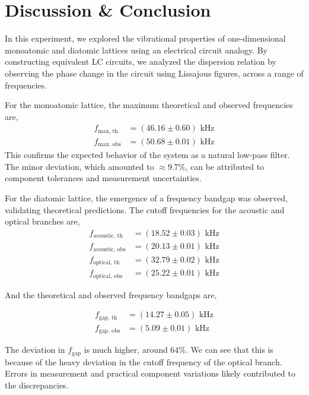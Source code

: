\vspace{-2em}
\section{Discussion \& Conclusion}

In this experiment, we explored the vibrational properties of
one-dimensional monoatomic and diatomic lattices using
an electrical circuit analogy. By constructing equivalent
LC circuits, we analyzed the dispersion relation by observing the phase change in the circuit using Lissajous figures, across a range of frequencies.

For the monoatomic lattice, the maximum theoretical and observed frequencies are,
\begin{align*}
    f_\text{max, th} &= (46.16 \pm 0.60) \text{ kHz}\\
    f_\text{max, obs} &= (50.68 \pm 0.01) \text{ kHz}
\end{align*}
This confirms the expected behavior of the system as a natural low-pass filter. The minor
deviation, which amounted to $\approx$9.7\%, can be attributed to component tolerances and measurement uncertainties.

For the diatomic lattice, the emergence of a frequency bandgap was observed, validating theoretical predictions. 
The cutoff frequencies for the acoustic and optical branches are,
\begin{align*}
    f_\text{acoustic, th} &= (18.52 \pm 0.03) \text{ kHz}\\
    f_\text{acoustic, obs} &= (20.13 \pm 0.01) \text{ kHz}\\
    f_\text{optical, th} &= (32.79 \pm 0.02) \text{ kHz}\\
    f_\text{optical, obs} &= (25.22 \pm 0.01) \text{ kHz}
\end{align*}

And the theoretical and observed frequency bandgaps are,

\begin{align*}
    f_\text{gap, th} &= (14.27 \pm 0.05) \text{ kHz}\\
    f_\text{gap, obs} &= (5.09 \pm 0.01) \text{ kHz}
\end{align*}

The deviation in $f_\text{gap}$ is much higher, around 64\%. We can see that this is because of the heavy deviation in the cutoff frequency of the optical branch. Errors in measurement and
practical component variations likely contributed to the discrepancies.

